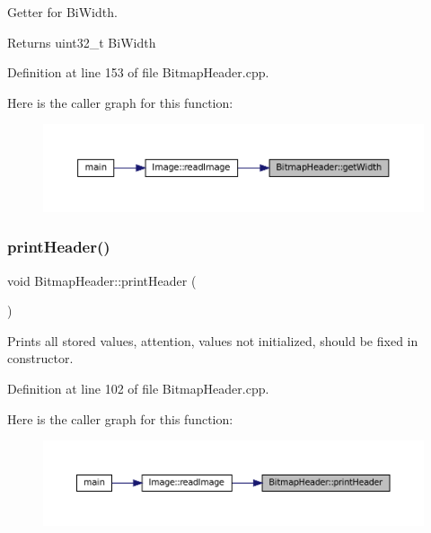 Getter for Bi\+Width. 

\begin{DoxyReturn}{Returns}
uint32\+\_\+t Bi\+Width 
\end{DoxyReturn}


Definition at line 153 of file Bitmap\+Header.\+cpp.

Here is the caller graph for this function\+:
\nopagebreak
\begin{figure}[H]
\begin{center}
\leavevmode
\includegraphics[width=350pt]{classBitmapHeader_af1d36ee9f3315866f05c39c2f4871e09_icgraph}
\end{center}
\end{figure}
\mbox{\label{classBitmapHeader_a72e26bdf3269d382dfbdc76119c1a6aa}} 
\subsubsection{\texorpdfstring{printHeader()}{printHeader()}}
{\footnotesize\ttfamily void Bitmap\+Header\+::print\+Header (\begin{DoxyParamCaption}{ }\end{DoxyParamCaption})}



Prints all stored values, attention, values not initialized, should be fixed in constructor. 



Definition at line 102 of file Bitmap\+Header.\+cpp.

Here is the caller graph for this function\+:
\nopagebreak
\begin{figure}[H]
\begin{center}
\leavevmode
\includegraphics[width=350pt]{classBitmapHeader_a72e26bdf3269d382dfbdc76119c1a6aa_icgraph}
\end{center}
\end{figure}
\mbox{\label{classBitmapHeader_aebc19bf8a908f1f7edfc5b10186c9db8}} 
